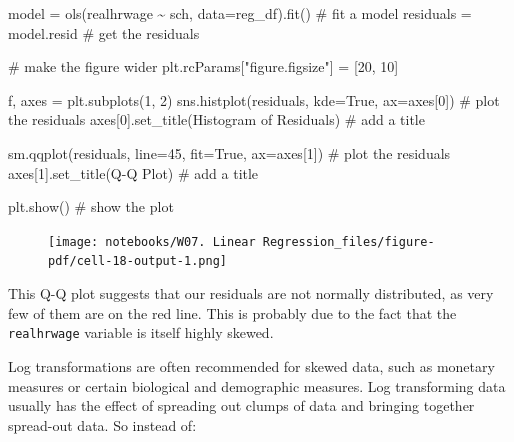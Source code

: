 \documentclass[
  letterpaper,
  DIV=11,
  numbers=noendperiod]{scrreprt}
\newenvironment{Shaded}{\begin{snugshade}}{\end{snugshade}}
\newcommand{\CommentTok}[1]{\textcolor[rgb]{0.37,0.37,0.37}{#1}}
\newcommand{\DecValTok}[1]{\textcolor[rgb]{0.68,0.00,0.00}{#1}}
\newcommand{\NormalTok}[1]{\textcolor[rgb]{0.00,0.23,0.31}{#1}}
\newcommand{\OperatorTok}[1]{\textcolor[rgb]{0.37,0.37,0.37}{#1}}
\newcommand{\StringTok}[1]{\textcolor[rgb]{0.13,0.47,0.30}{#1}}
\newcommand{\VariableTok}[1]{\textcolor[rgb]{0.07,0.07,0.07}{#1}}
\begin{document}
\begin{Shaded}
\begin{Highlighting}[]
\NormalTok{model }\OperatorTok{=}\NormalTok{ ols(}\StringTok{\textquotesingle{}realhrwage \textasciitilde{}  sch\textquotesingle{}}\NormalTok{, data}\OperatorTok{=}\NormalTok{reg\_df).fit()  }\CommentTok{\# fit a model}
\NormalTok{residuals }\OperatorTok{=}\NormalTok{ model.resid }\CommentTok{\# get the residuals}

\CommentTok{\# make the figure wider}
\NormalTok{plt.rcParams[}\StringTok{"figure.figsize"}\NormalTok{] }\OperatorTok{=}\NormalTok{ [}\DecValTok{20}\NormalTok{, }\DecValTok{10}\NormalTok{]}

\NormalTok{f, axes }\OperatorTok{=}\NormalTok{ plt.subplots(}\DecValTok{1}\NormalTok{, }\DecValTok{2}\NormalTok{)}
\NormalTok{sns.histplot(residuals, kde}\OperatorTok{=}\VariableTok{True}\NormalTok{, ax}\OperatorTok{=}\NormalTok{axes[}\DecValTok{0}\NormalTok{]) }\CommentTok{\# plot the residuals}
\NormalTok{axes[}\DecValTok{0}\NormalTok{].set\_title(}\StringTok{\textquotesingle{}Histogram of Residuals\textquotesingle{}}\NormalTok{) }\CommentTok{\# add a title}

\NormalTok{sm.qqplot(residuals, line}\OperatorTok{=}\StringTok{\textquotesingle{}45\textquotesingle{}}\NormalTok{, fit}\OperatorTok{=}\VariableTok{True}\NormalTok{,  ax}\OperatorTok{=}\NormalTok{axes[}\DecValTok{1}\NormalTok{]) }\CommentTok{\# plot the residuals}
\NormalTok{axes[}\DecValTok{1}\NormalTok{].set\_title(}\StringTok{\textquotesingle{}Q{-}Q Plot\textquotesingle{}}\NormalTok{) }\CommentTok{\# add a title}

\NormalTok{plt.show() }\CommentTok{\# show the plot}
\end{Highlighting}
\end{Shaded}

\begin{figure}[H]

{\centering \texttt{[image: notebooks/W07. Linear Regression\_files/figure-pdf/cell-18-output-1.png]}

}

\end{figure}

This Q-Q plot suggests that our residuals are not normally distributed,
as very few of them are on the red line. This is probably due to the
fact that the \texttt{realhrwage} variable is itself highly skewed.

Log transformations are often recommended for skewed data, such as
monetary measures or certain biological and demographic measures. Log
transforming data usually has the effect of spreading out clumps of data
and bringing together spread-out data. So instead of:
\end{document}
